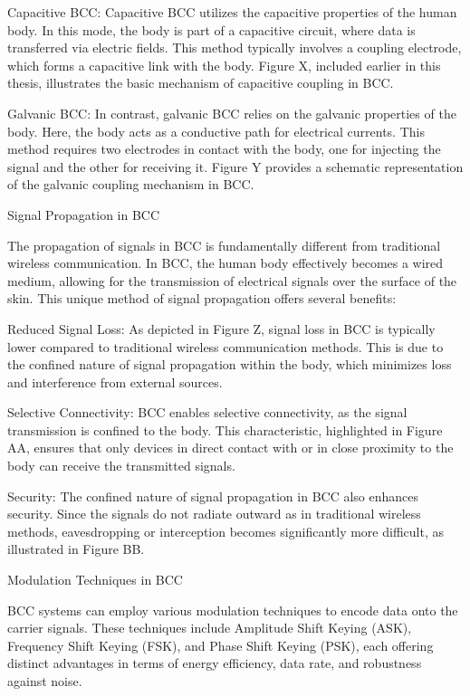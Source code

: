 {Capacitive BCC: Capacitive BCC utilizes the capacitive properties of the human body. In this mode, the body is part of a capacitive circuit, where data is transferred via electric fields. This method typically involves a coupling electrode, which forms a capacitive link with the body. Figure X, included earlier in this thesis, illustrates the basic mechanism of capacitive coupling in BCC.

Galvanic BCC: In contrast, galvanic BCC relies on the galvanic properties of the body. Here, the body acts as a conductive path for electrical currents. This method requires two electrodes in contact with the body, one for injecting the signal and the other for receiving it. Figure Y provides a schematic representation of the galvanic coupling mechanism in BCC.

Signal Propagation in BCC

The propagation of signals in BCC is fundamentally different from traditional wireless communication. In BCC, the human body effectively becomes a wired medium, allowing for the transmission of electrical signals over the surface of the skin. This unique method of signal propagation offers several benefits:

Reduced Signal Loss: As depicted in Figure Z, signal loss in BCC is typically lower compared to traditional wireless communication methods. This is due to the confined nature of signal propagation within the body, which minimizes loss and interference from external sources.

Selective Connectivity: BCC enables selective connectivity, as the signal transmission is confined to the body. This characteristic, highlighted in Figure AA, ensures that only devices in direct contact with or in close proximity to the body can receive the transmitted signals.

Security: The confined nature of signal propagation in BCC also enhances security. Since the signals do not radiate outward as in traditional wireless methods, eavesdropping or interception becomes significantly more difficult, as illustrated in Figure BB.

Modulation Techniques in BCC

BCC systems can employ various modulation techniques to encode data onto the carrier signals. These techniques include Amplitude Shift Keying (ASK), Frequency Shift Keying (FSK), and Phase Shift Keying (PSK), each offering distinct advantages in terms of energy efficiency, data rate, and robustness against noise.

}

